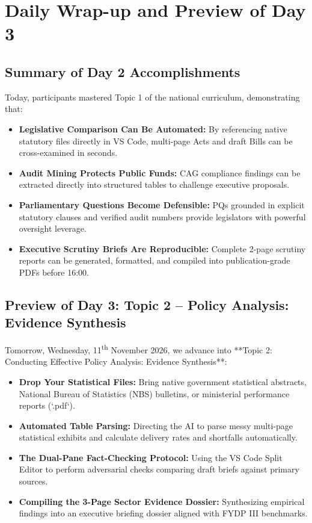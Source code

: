 \documentclass[11pt, a4paper]{report}
\begin{document}
\newpage

\chapter{Daily Wrap-up and Preview of Day 3}

\section{Summary of Day 2 Accomplishments}
Today, participants mastered Topic 1 of the national curriculum, demonstrating that:
\begin{itemize}[label=-]
    \item \textbf{Legislative Comparison Can Be Automated:} By referencing native statutory files directly in VS Code, multi-page Acts and draft Bills can be cross-examined in seconds.
    \item \textbf{Audit Mining Protects Public Funds:} CAG compliance findings can be extracted directly into structured tables to challenge executive proposals.
    \item \textbf{Parliamentary Questions Become Defensible:} PQs grounded in explicit statutory clauses and verified audit numbers provide legislators with powerful oversight leverage.
    \item \textbf{Executive Scrutiny Briefs Are Reproducible:} Complete 2-page scrutiny reports can be generated, formatted, and compiled into publication-grade PDFs before 16:00.
\end{itemize}

\section{Preview of Day 3: Topic 2 -- Policy Analysis: Evidence Synthesis}
Tomorrow, Wednesday, 11\textsuperscript{th} November 2026, we advance into **Topic 2: Conducting Effective Policy Analysis: Evidence Synthesis**:
\begin{itemize}[label=-]
    \item \textbf{Drop Your Statistical Files:} Bring native government statistical abstracts, National Bureau of Statistics (NBS) bulletins, or ministerial performance reports (`.pdf`).
    \item \textbf{Automated Table Parsing:} Directing the AI to parse messy multi-page statistical exhibits and calculate delivery rates and shortfalls automatically.
    \item \textbf{The Dual-Pane Fact-Checking Protocol:} Using the VS Code Split Editor to perform adversarial checks comparing draft briefs against primary sources.
    \item \textbf{Compiling the 3-Page Sector Evidence Dossier:} Synthesizing empirical findings into an executive briefing dossier aligned with FYDP III benchmarks.
\end{itemize}
\end{document}
